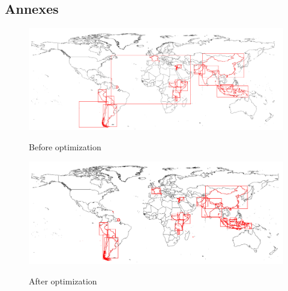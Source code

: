 \documentclass[utf8]{article}
\begin{document}
\begin{large}
  \section{Annexes}
  \begin{figure}[h]
    \caption{Before optimization}\label{Figure 1}
    \includegraphics[width=\textwidth]{beforeopti.png}\label{fig:beforeopti}
  \end{figure}

  \begin{figure}[h]
    \caption{After optimization}\label{Figure 2}
    \includegraphics[width=\textwidth]{afterOpti.png}\label{fig:afteropti}
  \end{figure}


\end{large}
\end{document}
